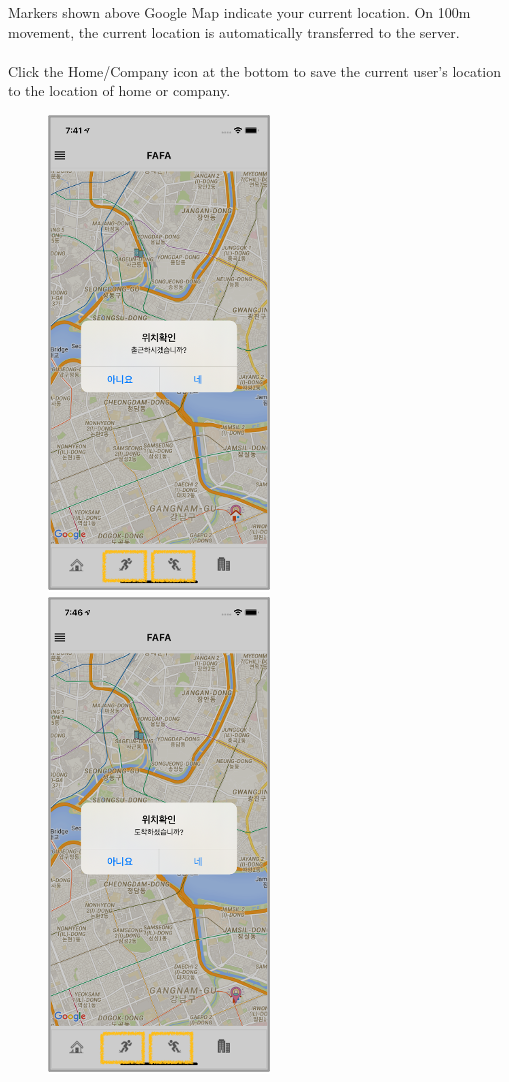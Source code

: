 \documentclass[conference]{IEEEtran}
\begin{document}
\begin{enumerate}
    Markers shown above Google Map indicate your current location. On 100m movement, the current location is automatically transferred to the server.\\ \\
    Click the Home/Company icon at the bottom to save the current user’s location to the location of home or company.\\
    \begin{figure}[htbp]
    \centering
    \hfill
    \includegraphics{images/f12-1.png}
    \hfill
    \includegraphics{images/f12-2.png}

\end{figure}
\end{enumerate}
\end{document}

